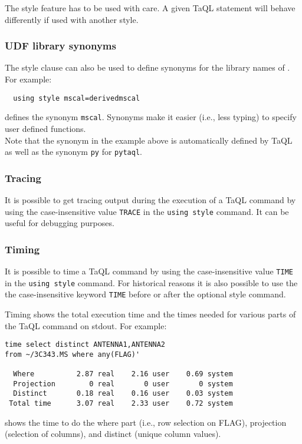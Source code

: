 The style feature has to be used with care. A given TaQL statement will
behave differently if used with another style.

\subsubsection{UDF library synonyms}
The style clause can also be used to define synonyms for the
library names of . For example:
\begin{verbatim}
  using style mscal=derivedmscal
\end{verbatim}
defines the synonym \texttt{mscal}. Synonyms make it
easier (i.e., less typing) to specify user defined functions.
\\Note that the synonym in the example above is automatically defined
by TaQL as well as the synonym \texttt{py} for \texttt{pytaql}.

\subsubsection{Tracing}
It is possible to get tracing output during the execution of a TaQL
command by using the case-insensitive value \texttt{TRACE} in the
\texttt{using style} command. It can be useful for debugging purposes.

\subsubsection{Timing}
It is possible to time a TaQL command by using the case-insensitive
value \texttt{TIME} in the \texttt{using style} command. 
For historical reasons it is also possible to use the the case-insensitive
keyword \texttt{TIME} before or after the optional style command.

Timing shows the total execution time and the times needed for various parts of the
TaQL command on stdout. For example:
\begin{verbatim}
time select distinct ANTENNA1,ANTENNA2
from ~/3C343.MS where any(FLAG)'

  Where          2.87 real    2.16 user    0.69 system
  Projection        0 real       0 user       0 system
  Distinct       0.18 real    0.16 user    0.03 system
 Total time      3.07 real    2.33 user    0.72 system
\end{verbatim}
shows the time to do the where part (i.e., row selection on FLAG),
projection (selection of columns), and distinct (unique column values).

